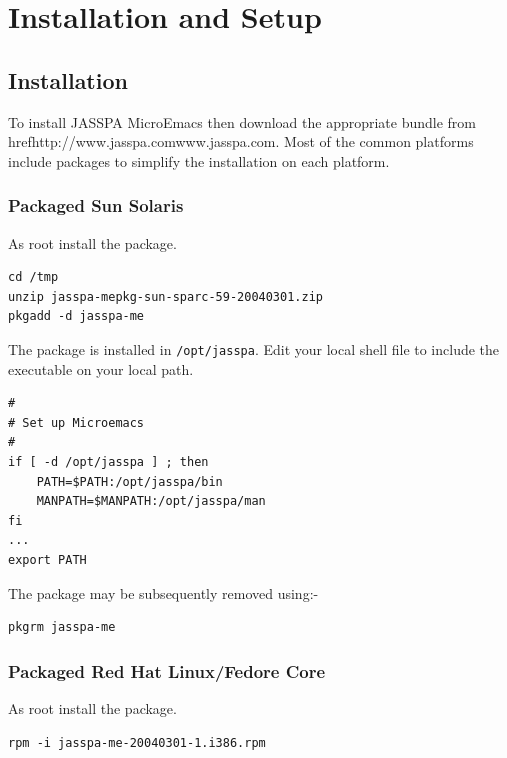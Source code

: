\documentclass[11pt,a4paper,pdftex]{article}
\begin{document}
\setlength{\parindent}{0pt}
\setlength{\parskip}{0.5ex}

\section{Installation and Setup}

\subsection{Installation}

To install JASSPA MicroEmacs then download the appropriate bundle from
href{http://www.jasspa.com}{www.jasspa.com}. Most of the common platforms
include packages to simplify the installation on each platform.

\subsubsection{Packaged Sun Solaris}

    As root install the package.

\begin{verbatim}
cd /tmp
unzip jasspa-mepkg-sun-sparc-59-20040301.zip
pkgadd -d jasspa-me
\end{verbatim}

    The package is installed in \texttt{/opt/jasspa}. Edit your local shell
    file to include the executable on your local path.

\begin{verbatim}
#
# Set up Microemacs
#
if [ -d /opt/jasspa ] ; then
    PATH=$PATH:/opt/jasspa/bin
    MANPATH=$MANPATH:/opt/jasspa/man
fi
...
export PATH
\end{verbatim}

    The package may be subsequently removed using:-

\begin{verbatim}
pkgrm jasspa-me
\end{verbatim}

\subsubsection{Packaged Red Hat Linux/Fedore Core}

    As root install the package.

\begin{verbatim}
rpm -i jasspa-me-20040301-1.i386.rpm
\end{verbatim}
\end{document}
